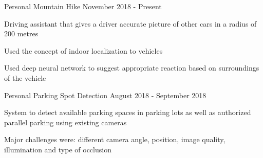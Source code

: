 \begin{cventries}
\cventry
    {Personal}
    {Mountain Hike}
    {}
    {November 2018 - Present}
    {
     \begin{cvitems} %
        \item {Driving assistant that gives a driver accurate picture of other cars in a radius of 200 metres}
        \item {Used the concept of indoor localization to vehicles}
        \item {Used deep neural network to suggest appropriate reaction based on surroundings of the vehicle}
      \end{cvitems}
    }

\cventry
    {Personal}
    {Parking Spot Detection}
    {}
    {August 2018 - September 2018}
    {
     \begin{cvitems} %
        \item {System to detect available parking spaces in parking lots as well as authorized parallel parking using existing cameras}
        \item{Major challenges were: different camera angle, position, image quality, illumination and type of occlusion}
      \end{cvitems}
    }

\end{cventries}


